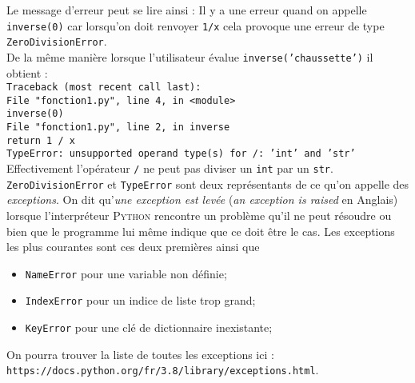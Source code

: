 \documentclass[a4paper,10pt,cours]{nsi}
\begin{document}
Le message d'erreur peut se lire ainsi : Il y a une erreur quand on appelle \texttt{inverse(0)} car lorsqu'on doit renvoyer \texttt{1/x} cela provoque une erreur de type \texttt{ZeroDivisionError}.\\

De la même manière lorsque l'utilisateur évalue \texttt{inverse('chaussette')} il obtient :\\

{\color{red}\texttt{Traceback (most recent call last):\\
    \hspace{2em}File "fonction1.py", line 4, in <module>\\
    \hspace{4em}inverse(0)\\
    \hspace{2em}File "fonction1.py", line 2, in inverse\\
    \hspace{4em}return 1 / x\\
    TypeError: unsupported operand type(s) for /: 'int' and 'str'}}\\

Effectivement l'opérateur \texttt{/} ne peut pas diviser un \texttt{int} par un \texttt{str}.\\

\texttt{ZeroDivisionError} et \texttt{TypeError} sont deux représentants de ce qu'on appelle des \textit{exceptions}. On dit qu'\textit{une exception est levée} (\textit{an exception is raised} en Anglais) lorsque l'interpréteur \textsc{Python} rencontre un problème qu'il ne peut résoudre ou bien que le programme lui même indique que ce doit être le cas. Les exceptions les plus courantes sont ces deux premières ainsi que 
\begin{itemize}
    \item   \texttt{NameError} pour une variable non définie;
    \item   \texttt{IndexError} pour un indice de liste trop grand;
    \item   \texttt{KeyError} pour une clé de dictionnaire inexistante;
\end{itemize}

On pourra trouver la liste de toutes les exceptions ici :\\
\texttt{https://docs.python.org/fr/3.8/library/exceptions.html}.
\end{document}
